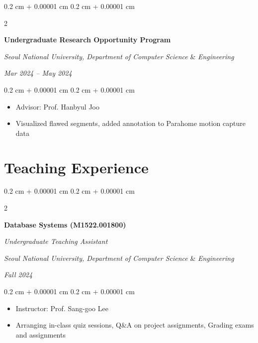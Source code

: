 \documentclass[10pt, letterpaper]{article}
\newenvironment{highlights}{
    \begin{itemize}[
        topsep=0.10 cm,
        parsep=0.10 cm,
        partopsep=0pt,
        itemsep=0pt,
        leftmargin=0.4 cm + 10pt
    ]
}{
    \end{itemize}
} %
\newenvironment{onecolentry}{
    \begin{adjustwidth}{
        0.2 cm + 0.00001 cm
    }{
        0.2 cm + 0.00001 cm
    }
}{
    \end{adjustwidth}
} %
\newenvironment{twocolentry}[2][]{
    \onecolentry
    \def\secondColumn{#2}
    \setcolumnwidth{\fill, 4.5 cm}
    \begin{paracol}{2}
}{
    \switchcolumn \raggedleft \secondColumn
    \end{paracol}
    \endonecolentry
} %
\begin{document}
        \vspace{0.3 cm}

        \begin{twocolentry}{
            
        \textit{Mar 2024 – May 2024}}
            \textbf{Undergraduate Research Opportunity Program}
            
            \textit{Seoul National University,  Department of Computer Science} \& \textit{Engineering}
        \end{twocolentry}

        \vspace{0.10 cm}
        \begin{onecolentry}
            \begin{highlights}
                \item Advisor: Prof. Hanbyul Joo
                \item Visualized flawed segments, added annotation to Parahome motion capture data
            \end{highlights}
        \end{onecolentry}
         

    \section{Teaching Experience}

        \begin{twocolentry}{
            
        \textit{Fall 2024}}
            \textbf{Database Systems (M1522.001800)}
            
            \textit{Undergraduate Teaching Assistant}
    
            \textit{Seoul National University,  Department of Computer Science} \& \textit{Engineering}
        \end{twocolentry}

        \vspace{0.10 cm}
        \begin{onecolentry}
            \begin{highlights}
                \item Instructor: Prof. Sang-goo Lee
                \item Arranging in-class quiz sessions, Q\&A on project assignments, Grading exams and assignments
            \end{highlights}
        \end{onecolentry}
\end{document}
